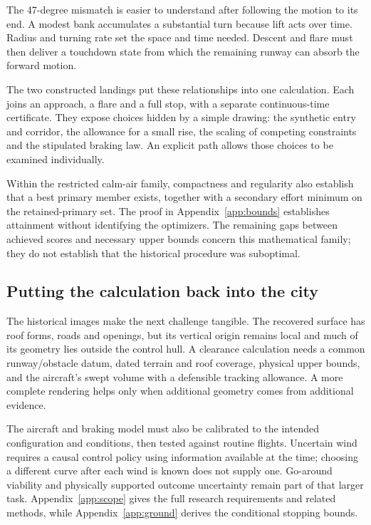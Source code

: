 \label{part:7}
The 47-degree mismatch is easier to understand after following the motion to its end. A modest bank accumulates a substantial turn because lift acts over time. Radius and turning rate set the space and time needed. Descent and flare must then deliver a touchdown state from which the remaining runway can absorb the forward motion.

The two constructed landings put these relationships into one calculation. Each joins an approach, a flare and a full stop, with a separate continuous-time certificate. They expose choices hidden by a simple drawing: the synthetic entry and corridor, the allowance for a small rise, the scaling of competing constraints and the stipulated braking law. An explicit path allows those choices to be examined individually.

Within the restricted calm-air family, compactness and regularity also establish that a best primary member exists, together with a secondary effort minimum on the retained-primary set. The proof in Appendix~\ref{app:bounds} establishes attainment without identifying the optimizers. The remaining gaps between achieved scores and necessary upper bounds concern this mathematical family; they do not establish that the historical procedure was suboptimal.

\subsection*{Putting the calculation back into the city}
The historical images make the next challenge tangible. The recovered surface has roof forms, roads and openings, but its vertical origin remains local and much of its geometry lies outside the control hull. A clearance calculation needs a common runway/obstacle datum, dated terrain and roof coverage, physical upper bounds, and the aircraft's swept volume with a defensible tracking allowance. A more complete rendering helps only when additional geometry comes from additional evidence.

The aircraft and braking model must also be calibrated to the intended configuration and conditions, then tested against routine flights. Uncertain wind requires a causal control policy using information available at the time; choosing a different curve after each wind is known does not supply one. Go-around viability and physically supported outcome uncertainty remain part of that larger task. Appendix~\ref{app:scope} gives the full research requirements and related methods, while Appendix~\ref{app:ground} derives the conditional stopping bounds.

